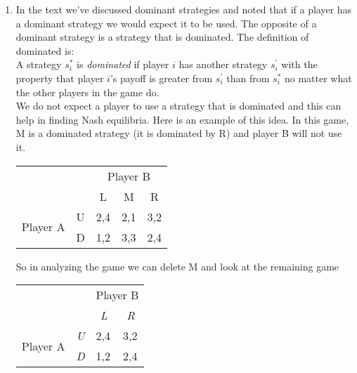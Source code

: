 \documentclass[twoside]{article}
\begin{document}
\begin{enumerate}
\begin{enumerate}
        
    \end{enumerate}
    
    \item In the text we've discussed dominant strategies and noted that if a player has a dominant strategy we would expect it to be used. The opposite of a dominant strategy is a strategy that is dominated. The definition of dominated is: \\
    A strategy $s_i^*$ is \emph{dominated} if player $i$ has another strategy $s_i^\prime$ with the property that player $i$'s payoff is greater from $s_i^\prime$ than from $s_i^*$ no matter what the other players in the game do. \\
    We do not expect a player to use a strategy that is dominated and this can help in finding Nash equilibria. Here is an example of this idea. In this game, M is a dominated strategy (it is dominated by R) and player B will not use it.
    
    \begin{center}
        \begin{tabular}{lllll}
                          &                        & \multicolumn{3}{c}{Player B}                                                   \\
                          &                        & \multicolumn{1}{c}{L}    & \multicolumn{1}{c}{M}    & \multicolumn{1}{c}{R}    \\ \cline{3-5} 
\multirow{2}{*}{Player A} & \multicolumn{1}{l|}{U} & \multicolumn{1}{l|}{2,4} & \multicolumn{1}{l|}{2,1} & \multicolumn{1}{l|}{3,2} \\ \cline{3-5} 
                          & \multicolumn{1}{l|}{D} & \multicolumn{1}{l|}{1,2} & \multicolumn{1}{l|}{3,3} & \multicolumn{1}{l|}{2,4} \\ \cline{3-5} 
        \end{tabular}
    \end{center}
    
    So in analyzing the game we can delete M and look at the remaining game
    
    \begin{center}
        \begin{tabular}{llll}
                          &                                 & \multicolumn{2}{c}{Player B}                                    \\
                          &                                 & \multicolumn{1}{c}{\textit{L}} & \multicolumn{1}{c}{\textit{R}} \\ \cline{3-4} 
\multirow{2}{*}{Player A} & \multicolumn{1}{l|}{\textit{U}} & \multicolumn{1}{l|}{2,4}       & \multicolumn{1}{l|}{3,2}       \\ \cline{3-4} 
                          & \multicolumn{1}{l|}{\textit{D}} & \multicolumn{1}{l|}{1,2}       & \multicolumn{1}{l|}{2,4}       \\ \cline{3-4} 
        \end{tabular}
    \end{center}
    

\end{enumerate}
\end{document}
